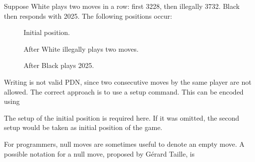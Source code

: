 \documentclass[letterpaper,10pt,english]{sphinxmanual}
\begin{document}
\sphinxAtStartPar
Suppose White plays two moves in a row: first 32\sphinxhyphen{}28, then illegally 37\sphinxhyphen{}32.
Black then responds with 20\sphinxhyphen{}25. The following positions occur:

\begin{figure}[htbp]
\centering
\capstart

\noindent{}
\caption{Initial position.}\label{\detokenize{commands:id2}}\end{figure}

\begin{figure}[htbp]
\centering
\capstart

\noindent{}
\caption{After White illegally plays two moves.}\label{\detokenize{commands:id3}}\end{figure}

\begin{figure}[htbp]
\centering
\capstart

\noindent{}
\caption{After Black plays 20\sphinxhyphen{}25.}\label{\detokenize{commands:id4}}\end{figure}

\sphinxAtStartPar
Writing  is not valid PDN, since two consecutive moves by the same player
are not allowed. The correct approach is to use a setup command. This can be encoded using

\begin{sphinxVerbatim}[commandchars=\\\{\}]
 
 
 
\end{sphinxVerbatim}

\sphinxAtStartPar
The setup of the initial position is required here. If it was
omitted, the second setup would be taken as initial position of the game.

\sphinxAtStartPar
{}

\sphinxAtStartPar
For programmers, null moves are sometimes useful to denote an empty move.
A possible notation for a null move, proposed by Gérard Taille, is
\end{document}
